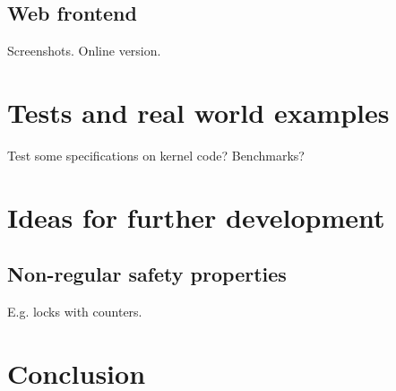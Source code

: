 \section{Web frontend}
Screenshots.
Online version.


\chapter{Tests and real world examples}
Test some specifications on kernel code?
Benchmarks?


\chapter{Ideas for further development}
\section{Non-regular safety properties}
E.g. locks with counters.


\chapter{Conclusion}


